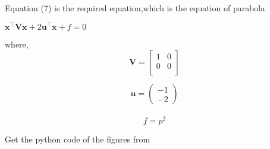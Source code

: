 \documentclass[10pt, a4paper]{article}
\newcommand{\myvec}[1]{\ensuremath{\begin{pmatrix}#1\end{pmatrix}}}
\let\vec\mathbf
\begin{document}
Equation (7) is the required equation,which is the equation of parabola
\boldmath

$\vec{x}^{\top}\vec{V}\vec{x}+2\vec{u}^{\top}\vec{x}+f=0$
\unboldmath

where,
$$
\vec{V}=
\begin{bmatrix}
1 & 0 \\
0 & 0 \\
\end{bmatrix}
$$

$$\vec{u}=\myvec{ -1 \\ -2 }$$\\
$$f=p^2$$




\vspace{3cm}
Get the python code of the figures from
\begin{table}[h]
\large
\centering
{}

\end{table}
\end{document}
